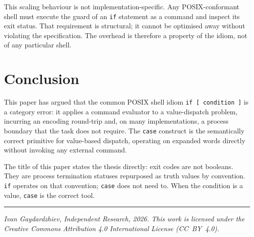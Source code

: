 \documentclass[11pt,a4paper]{article}
\begin{document}
This scaling behaviour is not implementation-specific.
Any POSIX-conformant shell must execute the guard of an \texttt{if}
statement as a command and inspect its exit status.
That requirement is structural; it cannot be optimised away without
violating the specification.
The overhead is therefore a property of the idiom, not of any
particular shell.

\section{Conclusion}

This paper has argued that the common POSIX shell idiom
\texttt{if [ condition ]} is a category error: it applies a
command evaluator to a value-dispatch problem, incurring an
encoding round-trip and, on many implementations, a process
boundary that the task does not require.
The \texttt{case} construct is the semantically correct primitive
for value-based dispatch, operating on expanded words directly
without invoking any external command.

The title of this paper states the thesis directly: exit codes
are not booleans.
They are process termination statuses repurposed as truth values
by convention.
\texttt{if} operates on that convention; \texttt{case} does not
need to.
When the condition is a value, \texttt{case} is the correct tool.

\vspace{10pt}
\noindent\rule{\linewidth}{0.4pt}
\vspace{4pt}

{\small
\noindent
\textit{Ivan Gaydardzhiev, Independent Research, 2026.
This work is licensed under the Creative Commons Attribution 4.0
International License (CC~BY~4.0).}
}
\end{document}
